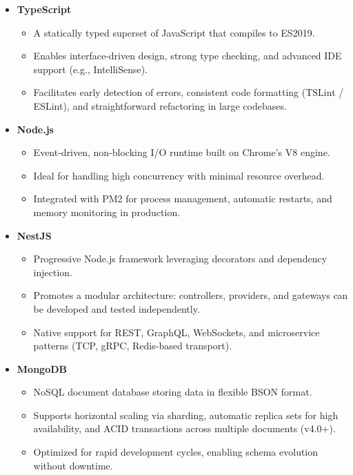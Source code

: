 \begin{itemize}
  \item \textbf{TypeScript}  
    \begin{itemize}
      \item A statically typed superset of JavaScript that compiles to ES2019.  
      \item Enables interface-driven design, strong type checking, and advanced IDE support (e.g., IntelliSense).  
      \item Facilitates early detection of errors, consistent code formatting (TSLint / ESLint), and straightforward refactoring in large codebases.
    \end{itemize}

  \item \textbf{Node.js}  
    \begin{itemize}
      \item Event-driven, non-blocking I/O runtime built on Chrome’s V8 engine.  
      \item Ideal for handling high concurrency with minimal resource overhead.  
      \item Integrated with PM2 for process management, automatic restarts, and memory monitoring in production.
    \end{itemize}

  \item \textbf{NestJS}  
    \begin{itemize}
      \item Progressive Node.js framework leveraging decorators and dependency injection.  
      \item Promotes a modular architecture: controllers, providers, and gateways can be developed and tested independently.  
      \item Native support for REST, GraphQL, WebSockets, and microservice patterns (TCP, gRPC, Redis-based transport).
    \end{itemize}

  \item \textbf{MongoDB}  
    \begin{itemize}
      \item NoSQL document database storing data in flexible BSON format.  
      \item Supports horizontal scaling via sharding, automatic replica sets for high availability, and ACID transactions across multiple documents (v4.0+).  
      \item Optimized for rapid development cycles, enabling schema evolution without downtime.
    \end{itemize}


\end{itemize}
